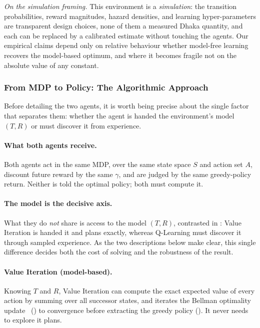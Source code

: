 \documentclass{ai-lab-report}
\begin{document}
\emph{On the simulation framing.} This environment is a \emph{simulation}: the transition probabilities, reward magnitudes, hazard densities, and learning hyper-parameters are transparent design choices, none of them a measured Dhaka quantity, and each can be replaced by a calibrated estimate without touching the agents. Our empirical claims depend only on relative behaviour whether model-free learning recovers the model-based optimum, and where it becomes fragile not on the absolute value of any constant.

\subsubsection{From MDP to Policy: The Algorithmic Approach}

Before detailing the two agents, it is worth being precise about the single factor that separates them: whether the agent is handed the environment's model $(T,R)$ or must discover it from experience.

\paragraph{What both agents receive.}
Both agents act in the same MDP, over the same state space $S$ and action set $A$, discount future reward by the same $\gamma$, and are judged by the same greedy-policy return. Neither is told the optimal policy; both must compute it.

\paragraph{The model is the decisive axis.}
What they do \emph{not} share is access to the model $(T,R)$, contrasted in : Value Iteration is handed it and plans exactly, whereas Q-Learning must discover it through sampled experience. As the two descriptions below make clear, this single difference decides both the cost of solving and the robustness of the result.

\paragraph{Value Iteration (model-based).}
Knowing $T$ and $R$, Value Iteration can compute the exact expected value of every action by summing over all successor states, and iterates the Bellman optimality update~\citep{bellman1957dynamic} () to convergence before extracting the greedy policy (). It never needs to explore it plans.
\end{document}
